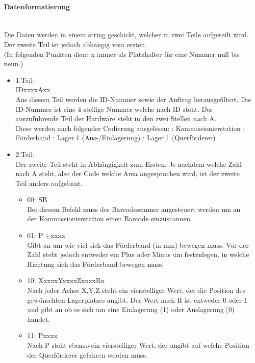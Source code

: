         \paragraph{Datenformatierung}\mbox{}\\
        Die Daten werden in einem string geschickt, welcher in zwei Teile aufgeteilt wird. Der zweite Teil ist jedoch abhängig vom ersten. \\
        (In folgenden Punkten dient x immer als Platzhalter für eine Nummer null bis neun.) 
        \begin{itemize}
            \item 1.Teil: \\
            IDxxxxAxx  \\
            Aus diesem Teil werden die ID-Nummer sowie der Auftrag herausgefiltert. Die ID-Nummer ist eine 4 stellige Nummer welche nach ID steht. Der auszuführende Teil der Hardware steht in den zwei Stellen nach A.\\
            Diese werden nach folgender Codierung ausgelesen:
                : Kommissionierstation
                : Förderband
                : Lager 1 (Aus-/Einlagerung)
                : Lager 1 (Querförderer)
            \item 2.Teil: \\
            Der zweite Teil steht in Abhängigkeit zum Ersten. Je nachdem welche Zahl nach A steht, also der Code welche Area angesprochen wird, ist der zweite Teil anders aufgebaut.
                \begin{itemize}
                \item 00: SB\\
                Bei diesem Befehl muss der Barcodescanner angesteuert werden um an der Kommissionierstation einen Barcode einzuscannen.
                \item 01: P $\pm$xxxx \\
                Gibt an um wie viel sich das Förderband (in mm) bewegen muss. Vor der Zahl steht jedoch entweder ein Plus oder Minus um festzulegen, in welche Richtung sich das Förderband bewegen muss. 
                \item 10: XxxxxYxxxxZxxxxRx \\
                Nach jeder Achse X,Y,Z steht ein vierstelliger Wert, der die Position des gewünschten Lagerplatzes angibt. Der Wert nach R ist entweder 0 oder 1 und gibt an ob es sich um eine Einlagerung (1) oder Auslagerung (0) handet.
                \item 11: Pxxxx \\
                Nach P steht ebenso ein vierstelliger Wert, der angibt auf welche Position der Querförderer gefahren werden muss. 
                
                \end{itemize}
            
        \end{itemize}

